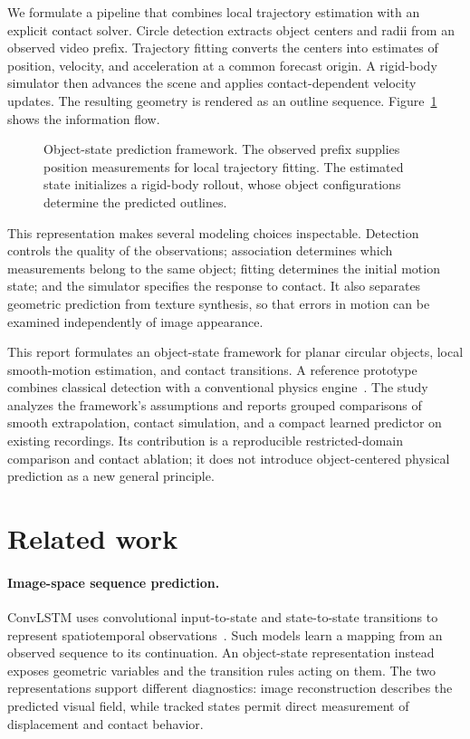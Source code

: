 \documentclass{article}
\begin{document}
We formulate a pipeline that combines local trajectory estimation with an explicit contact solver. Circle detection extracts object centers and radii from an observed video prefix. Trajectory fitting converts the centers into estimates of position, velocity, and acceleration at a common forecast origin. A rigid-body simulator then advances the scene and applies contact-dependent velocity updates. The resulting geometry is rendered as an outline sequence. Figure~\ref{fig:pipeline} shows the information flow.

\begin{figure}[t]
  \centering
  
  \caption{Object-state prediction framework. The observed prefix supplies position measurements for local trajectory fitting. The estimated state initializes a rigid-body rollout, whose object configurations determine the predicted outlines.}
  \label{fig:pipeline}
\end{figure}

This representation makes several modeling choices inspectable. Detection controls the quality of the observations; association determines which measurements belong to the same object; fitting determines the initial motion state; and the simulator specifies the response to contact. It also separates geometric prediction from texture synthesis, so that errors in motion can be examined independently of image appearance.

This report formulates an object-state framework for planar circular objects, local smooth-motion estimation, and contact transitions. A reference prototype combines classical detection with a conventional physics engine~\citep{projectrepo}. The study analyzes the framework's assumptions and reports grouped comparisons of smooth extrapolation, contact simulation, and a compact learned predictor on existing recordings. Its contribution is a reproducible restricted-domain comparison and contact ablation; it does not introduce object-centered physical prediction as a new general principle.

\section{Related work}

\paragraph{Image-space sequence prediction.}
ConvLSTM uses convolutional input-to-state and state-to-state transitions to represent spatiotemporal observations~\citep{shi2015convlstm}. Such models learn a mapping from an observed sequence to its continuation. An object-state representation instead exposes geometric variables and the transition rules acting on them. The two representations support different diagnostics: image reconstruction describes the predicted visual field, while tracked states permit direct measurement of displacement and contact behavior.
\end{document}
